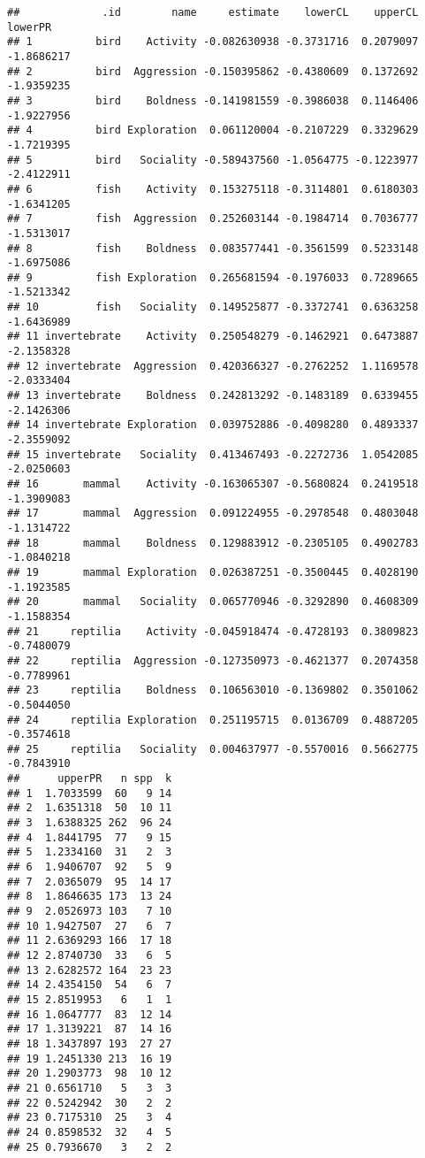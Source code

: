\documentclass[]{article}
\begin{document}
\begin{verbatim}
##             .id        name     estimate    lowerCL    upperCL    lowerPR
## 1          bird    Activity -0.082630938 -0.3731716  0.2079097 -1.8686217
## 2          bird  Aggression -0.150395862 -0.4380609  0.1372692 -1.9359235
## 3          bird    Boldness -0.141981559 -0.3986038  0.1146406 -1.9227956
## 4          bird Exploration  0.061120004 -0.2107229  0.3329629 -1.7219395
## 5          bird   Sociality -0.589437560 -1.0564775 -0.1223977 -2.4122911
## 6          fish    Activity  0.153275118 -0.3114801  0.6180303 -1.6341205
## 7          fish  Aggression  0.252603144 -0.1984714  0.7036777 -1.5313017
## 8          fish    Boldness  0.083577441 -0.3561599  0.5233148 -1.6975086
## 9          fish Exploration  0.265681594 -0.1976033  0.7289665 -1.5213342
## 10         fish   Sociality  0.149525877 -0.3372741  0.6363258 -1.6436989
## 11 invertebrate    Activity  0.250548279 -0.1462921  0.6473887 -2.1358328
## 12 invertebrate  Aggression  0.420366327 -0.2762252  1.1169578 -2.0333404
## 13 invertebrate    Boldness  0.242813292 -0.1483189  0.6339455 -2.1426306
## 14 invertebrate Exploration  0.039752886 -0.4098280  0.4893337 -2.3559092
## 15 invertebrate   Sociality  0.413467493 -0.2272736  1.0542085 -2.0250603
## 16       mammal    Activity -0.163065307 -0.5680824  0.2419518 -1.3909083
## 17       mammal  Aggression  0.091224955 -0.2978548  0.4803048 -1.1314722
## 18       mammal    Boldness  0.129883912 -0.2305105  0.4902783 -1.0840218
## 19       mammal Exploration  0.026387251 -0.3500445  0.4028190 -1.1923585
## 20       mammal   Sociality  0.065770946 -0.3292890  0.4608309 -1.1588354
## 21     reptilia    Activity -0.045918474 -0.4728193  0.3809823 -0.7480079
## 22     reptilia  Aggression -0.127350973 -0.4621377  0.2074358 -0.7789961
## 23     reptilia    Boldness  0.106563010 -0.1369802  0.3501062 -0.5044050
## 24     reptilia Exploration  0.251195715  0.0136709  0.4887205 -0.3574618
## 25     reptilia   Sociality  0.004637977 -0.5570016  0.5662775 -0.7843910
##      upperPR   n spp  k
## 1  1.7033599  60   9 14
## 2  1.6351318  50  10 11
## 3  1.6388325 262  96 24
## 4  1.8441795  77   9 15
## 5  1.2334160  31   2  3
## 6  1.9406707  92   5  9
## 7  2.0365079  95  14 17
## 8  1.8646635 173  13 24
## 9  2.0526973 103   7 10
## 10 1.9427507  27   6  7
## 11 2.6369293 166  17 18
## 12 2.8740730  33   6  5
## 13 2.6282572 164  23 23
## 14 2.4354150  54   6  7
## 15 2.8519953   6   1  1
## 16 1.0647777  83  12 14
## 17 1.3139221  87  14 16
## 18 1.3437897 193  27 27
## 19 1.2451330 213  16 19
## 20 1.2903773  98  10 12
## 21 0.6561710   5   3  3
## 22 0.5242942  30   2  2
## 23 0.7175310  25   3  4
## 24 0.8598532  32   4  5
## 25 0.7936670   3   2  2
\end{verbatim}
\end{document}
